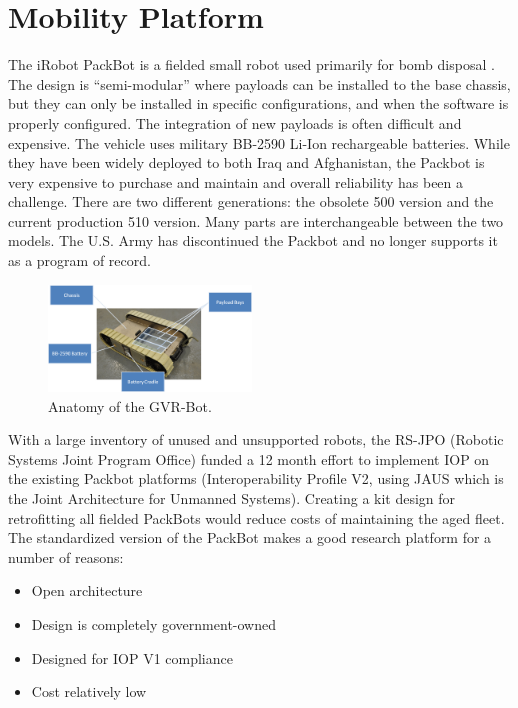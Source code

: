 \section{Mobility Platform}\label{sec:platform}

The iRobot PackBot is a fielded small robot used primarily for bomb disposal \cite{Hogg2002}. The design is ``semi-modular'' where payloads can be installed to the base chassis, but they can only be installed in specific configurations, and when the software is properly configured. The integration of new payloads is often difficult and expensive. The vehicle uses military BB-2590 Li-Ion rechargeable batteries. While they have been widely deployed to both Iraq and Afghanistan, the Packbot is very expensive to purchase and maintain and overall reliability has been a challenge. There are two different generations: the obsolete 500 version and the current production 510 version. Many parts are interchangeable between the two models. The U.S. Army has discontinued the Packbot and no longer supports it as a program of record.

\begin{figure}
	\centering
	\includegraphics[width=0.48\textwidth]{./pictures/packbot.png}
	\caption{Anatomy of the GVR-Bot.}
	\label{fig:packbot}
\end{figure}

With a large inventory of unused and unsupported robots, the RS-JPO (Robotic Systems Joint Program Office) funded a 12 month effort to implement IOP on the existing Packbot platforms (Interoperability Profile V2, using JAUS which is the Joint Architecture for Unmanned Systems). Creating a kit design for retrofitting all fielded PackBots would reduce costs of maintaining the aged fleet. The standardized version of the PackBot makes a good research platform for a number of reasons:
\begin{itemize}
	\item Open architecture
	\item Design is completely government-owned
	\item Designed for IOP V1 compliance
	\item Cost relatively low
\end{itemize}

